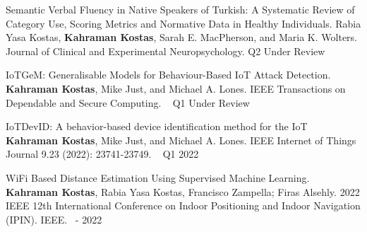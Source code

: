 


\begin{cvhonors}
  \cvhonor
    {Semantic Verbal Fluency in Native Speakers of Turkish: A Systematic Review of Category Use, Scoring Metrics and Normative Data in Healthy Individuals.} %
    {Rabia Yasa Kostas, \textbf{Kahraman Kostas}, Sarah E. MacPherson, and Maria K. Wolters.  Journal of Clinical and Experimental Neuropsychology.} %
    {Q2} %
    {Under Review} %

  \cvhonor
    {IoTGeM: Generalisable Models for Behaviour-Based IoT Attack Detection.} %
    {\textbf{Kahraman Kostas}, Mike Just, and Michael A. Lones. IEEE Transactions on Dependable and Secure Computing. \href{https://github.com/kahramankostas/IoTGeM}{\faGithub}~\href{https://github.com/kahramankostas/IoTGeM/blob/main/IoTGeM-Generalisable-Models-for-Behaviour-Based-IoT-Attack-Detection.pdf}{\faExternalLink}} %
    {Q1} %
    {Under Review} %




  \cvhonor
    {IoTDevID: A behavior-based device identification method for the IoT} %
    {\textbf{Kahraman Kostas}, Mike Just, and Michael A. Lones.  IEEE Internet of Things Journal 9.23 (2022): 23741-23749. \href{https://github.com/kahramankostas/IoTDevIDv2}{\faGithub}~\href{https://ieeexplore.ieee.org/document/9832419}{\faExternalLink} } %
    {Q1} %
    {2022} %

  \cvhonor
    {WiFi Based Distance Estimation Using Supervised Machine Learning.} %
    {\textbf{Kahraman Kostas}, Rabia Yasa Kostas, Francisco Zampella; Firas Alsehly.  2022 IEEE 12th International Conference on Indoor Positioning and Indoor Navigation (IPIN). IEEE.\href{https://github.com/kahramankostas/WiFi-Fingerprint}{\faGithub}~\href{https://ieeexplore.ieee.org/document/9918128}{\faExternalLink} } %
    {-} %
    {2022} %
    
    
 


\end{cvhonors}
